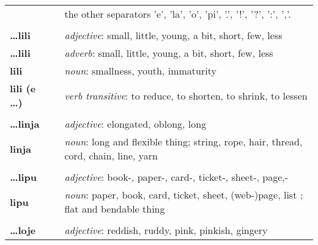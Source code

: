 \begin{supertabular}{p{2,5cm}|ll}
                                 &  & the other separators 'e', 'la', 'o', 'pi', '.', '!', '?', ':', ','.                                        \\
                                 &  &                                                                                                            \\
    \textbf{\dots lili}          &  & \textit{adjective}: small, little, young, a bit, short, few, less                                          \\
    \textbf{\dots lili}          &  & \textit{adverb}: small, little, young, a bit, short, few, less                                             \\
    \textbf{lili}                &  & \textit{noun}: smallness, youth, immaturity                                                                \\
    \textbf{lili (e \dots)}      &  & \textit{verb transitive}: to reduce, to shorten, to shrink, to lessen                                      \\
                                 &  &                                                                                                            \\
    \textbf{\dots linja}         &  & \textit{adjective}: elongated, oblong, long                                                                \\
    \textbf{linja}               &  & \textit{noun}: long and flexible thing; string, rope, hair, thread, cord, chain, line, yarn                \\
                                 &  &                                                                                                            \\
    \textbf{\dots lipu}          &  & \textit{adjective}: book-, paper-, card-, ticket-, sheet-, page,-                                          \\
    \textbf{lipu}                &  & \textit{noun}: paper, book, card, ticket, sheet, (web-)page, list ; flat and bendable thing                \\
                                 &  &                                                                                                            \\
    \textbf{\dots loje}          &  & \textit{adjective}: reddish, ruddy, pink, pinkish, gingery                                                 \\

\end{supertabular}
